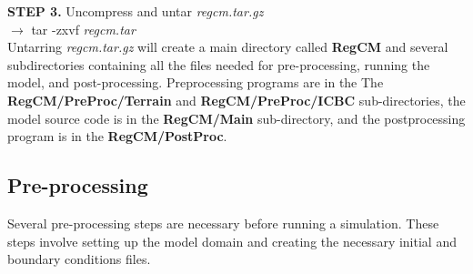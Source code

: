 \noindent
{\bf STEP 3.}  Uncompress and untar {\it regcm.tar.gz} \\

\indent
$\rightarrow$ tar -zxvf {\it regcm.tar} \\

\noindent
Untarring {\it regcm.tar.gz} will create a main directory called {\bf RegCM} and 
several subdirectories containing all the files needed for pre-processing, running the model, 
and post-processing.  Preprocessing programs are in the The {\bf RegCM/PreProc/Terrain} and
{\bf RegCM/PreProc/ICBC} sub-directories, the model source code is in the {\bf RegCM/Main} 
sub-directory, and the postprocessing program is in the  {\bf RegCM/PostProc}.


\subsection{Pre-processing}
\noindent
Several pre-processing steps are necessary before running a simulation. These steps involve setting up the model domain and creating the necessary initial and  boundary conditions files.

